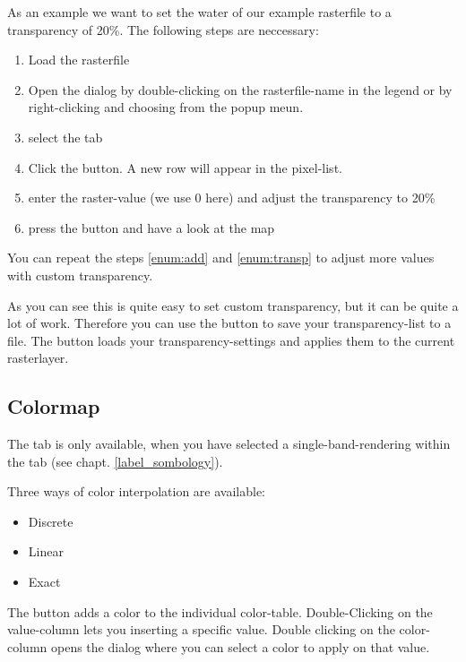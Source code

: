 As an example we want to set the water of our example rasterfile
 to a transparency of 20\%. The following steps
are neccessary:
\begin{enumerate}
 \item  Load the rasterfile 
 \item Open the  dialog by double-clicking on the
 rasterfile-name in the legend or by right-clicking and choosing
  from the popup meun.
 \item select the  tab
 \item \label{enum:add} Click the 
 button. A new row will appear in the pixel-list.
 \item \label{enum:transp} enter the raster-value (we use 0 here) and adjust the
 transparency to 20\%
 \item press the  button and have a look at the map
\end{enumerate}

You can repeat the steps \ref{enum:add} and \ref{enum:transp} to adjust
more values with custom transparency.

As you can see this is quite easy to set custom transparency, but it can be
quite a lot of work. Therefore you can use the button
 to save your
transparency-list to a file. The button
 loads your
transparency-settings and applies them to the current rasterlayer.

\subsection{Colormap} \label{label_colormaptab}

The  tab is only available, when you have selected a
single-band-rendering within the tab  (see chapt. \ref{label_sombology}).

Three ways of color interpolation are available:
\begin{itemize}[label=--]
\item Discrete
\item Linear
\item Exact
\end{itemize}

The button  adds a color to the individual color-table.
Double-Clicking on the value-column lets you inserting a specific value.
Double clicking on the color-column opens the dialog  where you can select a color to apply on that value.

